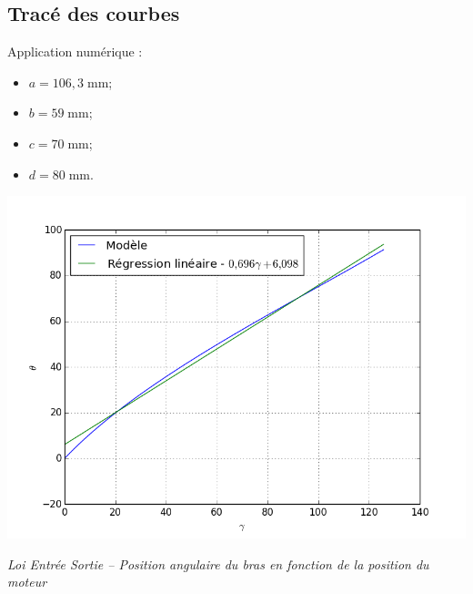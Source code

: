 \documentclass[10pt]{article}
\begin{document}
\subsection{Tracé des courbes} 
Application numérique : 
\begin{itemize}
\item $a = 106,3\; \text{mm}$;
\item $b = 59 \; \text{mm}$;
\item $c = 70 \; \text{mm}$;
\item $d = 80 \; \text{mm}$.
\end{itemize}

\begin{center}
\includegraphics[width=.45\textwidth]{images/LoiTheorique}

\textit{Loi Entrée Sortie -- Position angulaire du bras en fonction de la position du moteur} 
\end{center}

\begin{thebibliography}{2}
\end{thebibliography}
\end{document}

